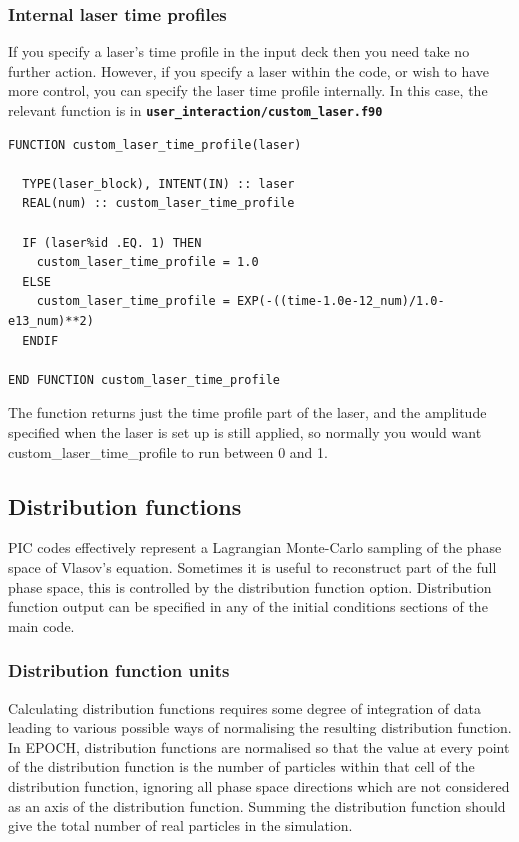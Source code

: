 \documentclass[12pt,a4paper]{article}
\newcommand{\simpleboxverbatim}{\begin{Verbatim}[obeytabs=true,frame=single,
  framerule=0.5mm,rulecolor=\color{warwickmid},formatcom=\color{black}]}
\newcommand{\inlinecode}[1]{{\color{warwickred} \bf\texttt{#1}}}
\begin{document}
\subsubsection{Internal laser time profiles}
If you specify a laser's time profile in the input deck then you need take no
further action. However, if you specify a laser within the code, or wish to
have more control, you can specify the laser time profile internally. In this
case, the relevant function is in
\inlinecode{user\_interaction/custom\_laser.f90}
\simpleboxverbatim
FUNCTION custom_laser_time_profile(laser)

  TYPE(laser_block), INTENT(IN) :: laser
  REAL(num) :: custom_laser_time_profile

  IF (laser%id .EQ. 1) THEN
    custom_laser_time_profile = 1.0
  ELSE
    custom_laser_time_profile = EXP(-((time-1.0e-12_num)/1.0-e13_num)**2)
  ENDIF

END FUNCTION custom_laser_time_profile
\end{Verbatim}
The function returns just the time profile part of the laser, and the
amplitude specified when the laser is set up is still applied, so normally you
would want custom\_laser\_time\_profile to run between 0 and 1.

\subsection{Distribution functions}
PIC codes effectively represent a Lagrangian Monte-Carlo sampling of the phase
space of Vlasov's equation. Sometimes it is useful to reconstruct part of the
full phase space, this is controlled by the distribution function
option.  Distribution function output can
be specified in any of the initial conditions sections of the main code.

\subsubsection{Distribution function units}
Calculating distribution functions requires some degree of integration of data
leading to various possible ways of normalising the resulting distribution
function. In EPOCH, distribution functions are normalised so that the value at
every point of the distribution function is the number of particles within
that cell of the distribution function, ignoring all phase space directions
which are not considered as an axis of the distribution function. Summing the
distribution function should give the total number of real particles in the
simulation.
\end{document}
